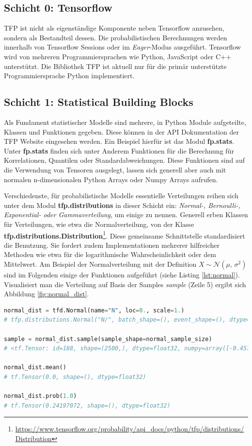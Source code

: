 \documentclass[12pt]{article}
\begin{document}
\subsection{Schicht 0: Tensorflow}
TFP ist nicht als eigenständige Komponente neben Tensorflow anzusehen, sondern als Bestandteil dessen. Die probabilistischen Berechnungen werden innerhalb von Tensorflow Sessions oder im \textit{Eager}-Modus ausgeführt. Tensorflow wird von mehreren Programmiersprachen wie Python, JavaScript oder C++ unterstützt. Die Bibliothek TFP ist aktuell nur für die primär unterstützte Programmiersprache Python implementiert.

\subsection{Schicht 1: Statistical Building Blocks}

Als Fundament statistischer Modelle sind mehrere, in Python Module aufgeteilte, Klassen und Funktionen gegeben. Diese können in der API Dokumentation der TFP Website eingesehen werden. Ein Beispiel hierfür ist das Modul \textbf{fp.stats}. Unter \textbf{fp.stats} finden sich unter Anderem Funktionen für die Berechnung für Korrelationen, Quantilen oder Standardabweichungen. Diese Funktionen sind auf die Verwendung von Tensoren ausgelegt, lassen sich generell aber auch mit normalen n-dimensionalen Python Arrays oder Numpy Arrays aufrufen.  

Verschiedenste, für probabilistische Modelle essentielle Verteilungen reihen sich unter dem Modul \textbf{tfp.distributions} in dieser Schicht ein: \textit{Normal-, Bernoulli-, Exponential- oder Gammaverteilung}, um einige zu nennen. Generell erben Klassen für Verteilungen, wie etwa die Normalverteilung, von der Klasse \textbf{tfp.distributions.Distribution}\footnote{\url{https://www.tensorflow.org/probability/api_docs/python/tfp/distributions/Distribution}}. Diese gemeinsame Schnittstelle standardisiert die Benutzung. Sie fordert zudem Implementationen mehrerer hilfreicher Methoden wie etwa für die logarithmische Wahrscheinlichkeit oder dem Mittelwert. Am Beispiel der Normalverteilung mit der Definition $X \sim \mathcal{N}(\mu,\,\sigma^{2})$ sind im Folgenden einige der Funktionen aufgeführt (siehe Listing \ref{lst:normal}). Visualisiert man die Verteilung auf Basis der Samples \textit{sample} (Zeile 5) ergibt sich Abbildung \ref{fig:normal_dist}.

\begin{lstlisting}[language=Python, caption={Verwendung der Klasse tfp.distributions.Normal}, label={lst:normal}]
normal_dist = tfd.Normal(name="N", loc=0., scale=1.)
# tfp.distributions.Normal("N/", batch_shape=(), event_shape=(), dtype=float32)

sample = normal_dist.sample(sample_shape=normal_sample_size)
# <tf.Tensor: id=188, shape=(2500,), dtype=float32, numpy=array([-0.45733708, -0.19126031, -0.33290815, ..., -1.1285563 , -0.6958163 ,  0.552399  ], dtype=float32)>

normal_dist.mean() 
# tf.Tensor(0.0, shape=(), dtype=float32)

normal_dist.prob(1.0) 
# tf.Tensor(0.24197072, shape=(), dtype=float32)
\end{lstlisting}
\end{document}
